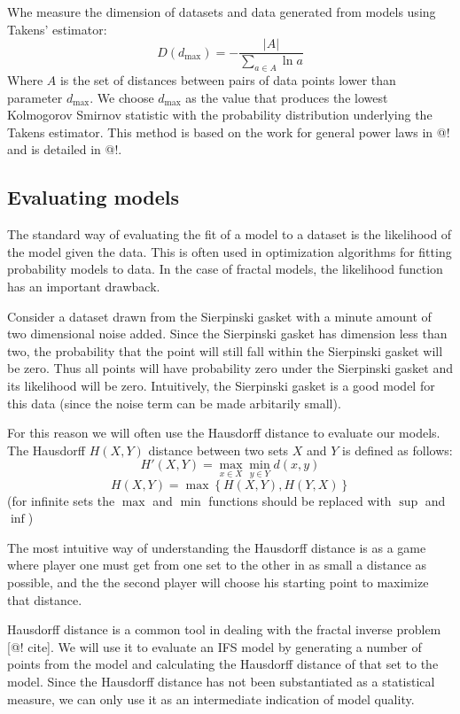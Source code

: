 \documentclass[11pt, twocolumn]{article}
\theoremstyle{definition}
\begin{document}
Whe measure the dimension of datasets and data generated from models using Takens' estimator:
\[
D(d_{\mbox{max}}) = -\frac{|A|}{\sum_{a \in A} \ln a} 
\]
Where $A$ is the set of distances between pairs of data points lower than parameter $d_{\mbox{max}}$. We choose $d_{\mbox{max}}$ as the value that produces the lowest Kolmogorov Smirnov statistic with the probability distribution underlying the Takens estimator. This method is based on the work for general power laws in @! and is detailed in @!.

\subsection{Evaluating models}

The standard way of evaluating the fit of a model to a dataset is the likelihood of the model given the data. This is often used in optimization algorithms for fitting probability models to data. In the case of fractal models, the likelihood function has an important drawback. 

Consider a dataset drawn from the Sierpinski gasket with a minute amount of two dimensional noise added. Since the Sierpinski gasket has dimension less than two, the probability that the point will still fall within the Sierpinski gasket will be zero. Thus all points will have probability zero under the Sierpinski gasket and its likelihood will be zero. Intuitively, the Sierpinski gasket is a good model for this data (since the noise term can be made arbitarily small).

For this reason we will often use the Hausdorff distance to evaluate our models. The Hausdorff $H(X, Y)$ distance between two sets $X$ and $Y$ is defined as follows:
\[ 
H'(X, Y) = \max_{x\in X} \min_{y\in Y} d(x, y) 
\]
\[
H(X, Y) = \max\left \{H(X, Y), H(Y, X)\right\}
\]
 (for infinite sets the $\max$ and $\min$ functions should be replaced with $\sup$ and $\inf$)
 
The most intuitive way of understanding the Hausdorff distance is as a game where player one must get from one set to the other in as small a distance as possible, and the the second player will choose his starting point to maximize that distance.

Hausdorff distance is a common tool in dealing with the fractal inverse problem [@! cite]. We will use it to evaluate an IFS model by generating a number of points from the model and calculating the Hausdorff distance of that set to the model. Since the Hausdorff distance has not been substantiated as a statistical measure, we can only use it as an intermediate indication of model quality. 
\end{document}
